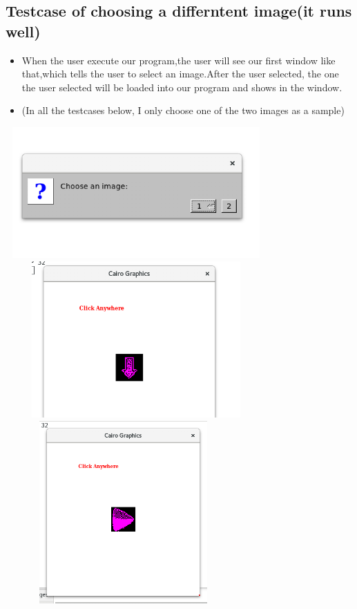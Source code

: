 \documentclass{article}
\begin{document}
\subsection*{Testcase of choosing a differntent image(it runs well)}
\begin{itemize}
	\item When the user execute our program,the user will see our first window like that,which tells the user to select an image.After the user selected, the one the user selected will be loaded into our program and shows in the window.
	\item (In all the testcases below, I only choose one of the two images as a sample)
\end{itemize}
\includegraphics[width = 10cm, height = 5cm]{ci.png}
\includegraphics[width = 10cm, height = 6cm]{ci1.png}
\includegraphics[width = 9cm, height = 7cm]{ci2.png}
\newpage
\end{document}
